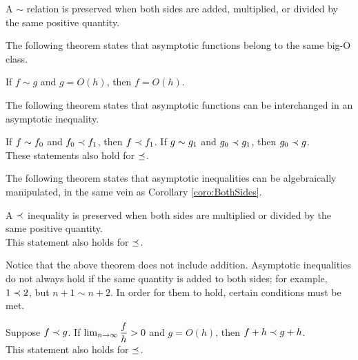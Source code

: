 \begin{corollary}
\label{coro:BothSides}
	A $\sim$ relation is preserved when both sides are added, multiplied, or divided by the same positive quantity.
\end{corollary}

The following theorem states that asymptotic functions belong to the same big-O class.

\begin{theorem}
\label{thm:SameBigOClass}
	If $f \sim g$ and $g = O(h)$, then $f = O(h)$.
\end{theorem}

The following theorem states that asymptotic functions can be interchanged in an asymptotic inequality.

\begin{theorem}
\label{thm:InterchangeableInInequality}
	If $f \sim f_0$ and $f_0 \prec f_1$, then $f \prec f_1$. If $g \sim g_1$ and $g_0 \prec g_1$, then $g_0 \prec g$.\\
	These statements also hold for $\preceq$.
\end{theorem}

The following theorem states that asymptotic inequalities can be algebraically manipulated, in the same vein as Corollary \ref{coro:BothSides}.

\begin{theorem}
\label{thm:BothSidesInequality}
	A $\prec$ inequality is preserved when both sides are multiplied or divided by the same positive quantity.\\
	This statement also holds for $\preceq$.
\end{theorem}

Notice that the above theorem does not include addition. Asymptotic inequalities do not always hold if the same quantity is added to both sides; for example, $1 \prec 2$, but $n + 1 \sim n + 2$. In order for them to hold, certain conditions must be met.

\begin{theorem}
\label{thm:BothSidesInequalityAdd}
	Suppose $f \prec g$. If $\lim_{n \to \infty} \dfrac{f}{h} > 0$ and $g = O(h)$, then $f + h \prec g + h$.\\
	This statement also holds for $\preceq$.
\end{theorem}